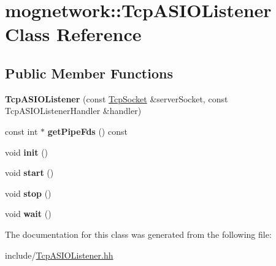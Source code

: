 \hypertarget{classmognetwork_1_1_tcp_a_s_i_o_listener}{\section{mognetwork\-:\-:Tcp\-A\-S\-I\-O\-Listener Class Reference}
\label{classmognetwork_1_1_tcp_a_s_i_o_listener}
}
\subsection*{Public Member Functions}
\begin{DoxyCompactItemize}
\item 
\hypertarget{classmognetwork_1_1_tcp_a_s_i_o_listener_a62e7217da0dbc18a7fc8fc5d9f6b9164}{{\bfseries Tcp\-A\-S\-I\-O\-Listener} (const \hyperlink{classmognetwork_1_1_tcp_socket}{Tcp\-Socket} \&server\-Socket, const Tcp\-A\-S\-I\-O\-Listener\-Handler \&handler)}\label{classmognetwork_1_1_tcp_a_s_i_o_listener_a62e7217da0dbc18a7fc8fc5d9f6b9164}

\item 
\hypertarget{classmognetwork_1_1_tcp_a_s_i_o_listener_ad1af93b5b6a6fe884252e902bcd0d645}{const int $\ast$ {\bfseries get\-Pipe\-Fds} () const }\label{classmognetwork_1_1_tcp_a_s_i_o_listener_ad1af93b5b6a6fe884252e902bcd0d645}

\item 
\hypertarget{classmognetwork_1_1_tcp_a_s_i_o_listener_ab82a084f84968f7ac7ab17a0eb74211f}{void {\bfseries init} ()}\label{classmognetwork_1_1_tcp_a_s_i_o_listener_ab82a084f84968f7ac7ab17a0eb74211f}

\item 
\hypertarget{classmognetwork_1_1_tcp_a_s_i_o_listener_afd805699dfe27ceb0541feeefacc13dc}{void {\bfseries start} ()}\label{classmognetwork_1_1_tcp_a_s_i_o_listener_afd805699dfe27ceb0541feeefacc13dc}

\item 
\hypertarget{classmognetwork_1_1_tcp_a_s_i_o_listener_ac9952961dce0f44bc720485a4e4e620d}{void {\bfseries stop} ()}\label{classmognetwork_1_1_tcp_a_s_i_o_listener_ac9952961dce0f44bc720485a4e4e620d}

\item 
\hypertarget{classmognetwork_1_1_tcp_a_s_i_o_listener_ae6327f6471291ba5107c0a9c3362b929}{void {\bfseries wait} ()}\label{classmognetwork_1_1_tcp_a_s_i_o_listener_ae6327f6471291ba5107c0a9c3362b929}

\end{DoxyCompactItemize}


The documentation for this class was generated from the following file\-:\begin{DoxyCompactItemize}
\item 
include/\hyperlink{_tcp_a_s_i_o_listener_8hh}{Tcp\-A\-S\-I\-O\-Listener.\-hh}\end{DoxyCompactItemize}
